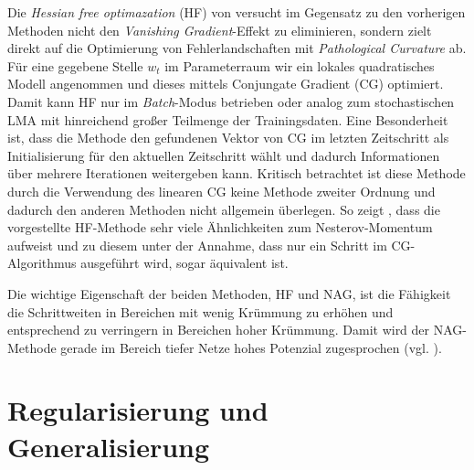 Die \textit{Hessian free optimazation} (HF) von \cite{Martens2010} versucht im Gegensatz zu den vorherigen Methoden nicht den \textit{Vanishing Gradient}-Effekt zu eliminieren, sondern zielt direkt auf die Optimierung von Fehlerlandschaften mit \textit{Pathological Curvature} ab.
Für eine gegebene Stelle $w_t$ im Parameterraum wir ein lokales quadratisches Modell angenommen und dieses mittels Conjungate Gradient (CG) optimiert. Damit kann HF nur im \textit{Batch}-Modus betrieben oder analog zum stochastischen LMA mit hinreichend großer Teilmenge der Trainingsdaten. Eine Besonderheit ist, dass die Methode den gefundenen Vektor von CG im letzten Zeitschritt als Initialisierung für den aktuellen Zeitschritt wählt und dadurch Informationen über mehrere Iterationen weitergeben kann.
Kritisch betrachtet ist diese Methode durch die Verwendung des linearen CG keine Methode zweiter Ordnung und dadurch den anderen Methoden nicht allgemein überlegen. So zeigt \cite{Sutskever2013}, dass die vorgestellte HF-Methode sehr viele Ähnlichkeiten zum Nesterov-Momentum aufweist und zu diesem unter der Annahme, dass nur ein Schritt im CG-Algorithmus ausgeführt wird, sogar äquivalent ist. 

Die wichtige Eigenschaft der beiden Methoden, HF und NAG, ist die Fähigkeit die Schrittweiten in Bereichen mit wenig Krümmung zu erhöhen und entsprechend zu verringern in Bereichen hoher Krümmung. Damit wird der NAG-Methode gerade im Bereich tiefer Netze hohes Potenzial zugesprochen (vgl. \cite{Sutskever2013}).

					

\section{Regularisierung und Generalisierung}
% 


